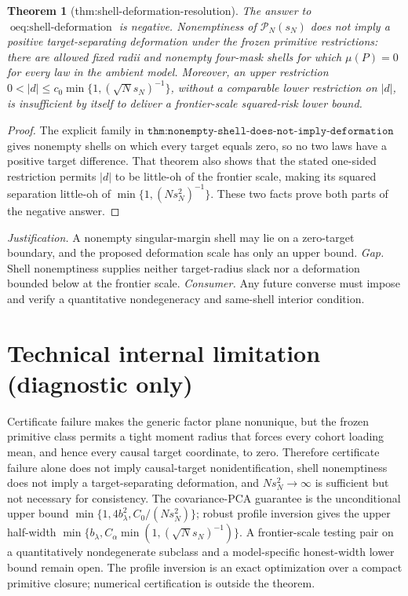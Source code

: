 \documentclass{article}
\newtheorem{theorem}{Theorem}
\begin{document}
\begin{theorem}[thm:shell-deformation-resolution]\label{thm:shell-deformation-resolution}
The answer to \(\operatorname{oeq:shell\text{-}deformation}\) is negative. Nonemptiness of \(\mathcal P_N(s_N)\) does not imply a positive target-separating deformation under the frozen primitive restrictions: there are allowed fixed radii and nonempty four-mask shells for which \(\mu(P)=0\) for every law in the ambient model. Moreover, an upper restriction \(0<|d|\leq c_0\min\{1,(\sqrt N s_N)^{-1}\}\), without a comparable lower restriction on \(|d|\), is insufficient by itself to deliver a frontier-scale squared-risk lower bound.
\end{theorem}
\begin{proof}
The explicit family in \(\texttt{thm:nonempty-shell-does-not-imply-deformation}\) gives nonempty shells on which every target equals zero, so no two laws have a positive target difference. That theorem also shows that the stated one-sided restriction permits \(|d|\) to be little-oh of the frontier scale, making its squared separation little-oh of \(\min\{1,(Ns_N^2)^{-1}\}\). These two facts prove both parts of the negative answer.
\end{proof}
\par\smallskip\noindent \textit{Justification.} A nonempty singular-margin shell may lie on a zero-target boundary, and the proposed deformation scale has only an upper bound. \textit{Gap.} Shell nonemptiness supplies neither target-radius slack nor a deformation bounded below at the frontier scale. \textit{Consumer.} Any future converse must impose and verify a quantitative nondegeneracy and same-shell interior condition.

\section*{Technical internal limitation (diagnostic only)}

Certificate failure makes the generic factor plane nonunique, but the frozen primitive class permits a tight moment radius that forces every cohort loading mean, and hence every causal target coordinate, to zero. Therefore certificate failure alone does not imply causal-target nonidentification, shell nonemptiness does not imply a target-separating deformation, and \(Ns_N^2\to\infty\) is sufficient but not necessary for consistency. The covariance-PCA guarantee is the unconditional upper bound \(\min\{1,4b_\lambda^2,C_0/(Ns_N^2)\}\); robust profile inversion gives the upper half-width \(\min\{b_\lambda,C_\alpha\min(1,(\sqrt N s_N)^{-1})\}\). A frontier-scale testing pair on a quantitatively nondegenerate subclass and a model-specific honest-width lower bound remain open. The profile inversion is an exact optimization over a compact primitive closure; numerical certification is outside the theorem.
\end{document}
